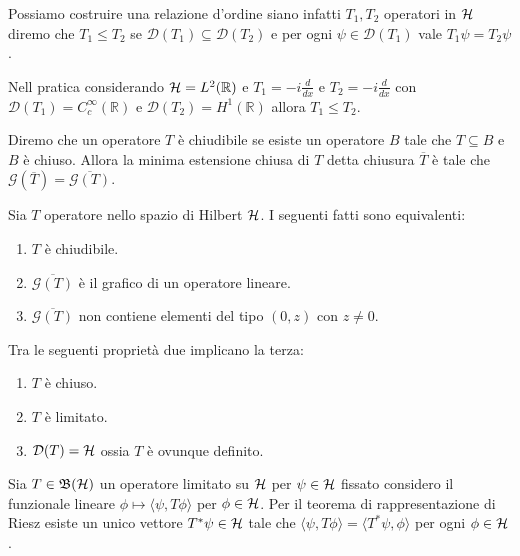 \begin{example}
    Possiamo costruire una relazione d'ordine siano infatti $T_1, T_2$ operatori in $\operatorname{\mathcal{H}}$ diremo che $T_1 \leq T_2$ se $\mathcal{D}(T_1) \subseteq \mathcal{D}(T_2)$ e per ogni $\psi \in \mathcal{D}(T_1)$ vale $T_1 \psi = T_2 \psi$.

    Nell pratica considerando $\operatorname{\mathcal{H}} = L^2(\mathbb{R})$ e $T_1 = -i \frac{d}{dx}$ e $T_2 = -i \frac{d}{dx}$ con $\mathcal{D}(T_1) = C^\infty_c(\mathbb{R})$ e $\mathcal{D}(T_2) = H^1(\mathbb{R})$ allora $T_1 \leq T_2$.
\end{example}

\begin{definition}
    Diremo che un operatore $T$ è chiudibile se esiste un operatore $B$ tale che $T \subseteq B$ e $B$ è chiuso. Allora la minima estensione chiusa di $T$ detta chiusura $\overline{T}$ è tale che $\mathcal{G}(\overline{T}) = \overline{\mathcal{G}(T)}$.
\end{definition}


\begin{proposition}
    Sia $T$ operatore nello spazio di Hilbert $\operatorname{\mathcal{H}}$. I seguenti fatti sono equivalenti:
\begin{enumerate}
    \item $T$ è chiudibile.
    \item $\overline{\mathcal{G}(T)}$ è il grafico di un operatore lineare.
    \item $\overline{\mathcal{G}(T)}$ non contiene elementi del tipo $(0,z)$ con $z \neq 0$.
\end{enumerate}
\end{proposition}


\begin{theorem}
    Tra le seguenti proprietà due implicano la terza:
\begin{enumerate}
    \item $T$ è chiuso.
    \item $T$ è limitato.
    \item $\mathcal{D}(T)=\operatorname{\mathcal{H}}$ ossia $T$ è ovunque definito.
\end{enumerate}
\end{theorem}

Sia $T \in \operatorname{\mathfrak{B}(\mathcal{H})}$ un operatore limitato su $\operatorname{\mathcal{H}}$ per $\psi \in \operatorname{\mathcal{H}}$ fissato considero il funzionale lineare $\phi \mapsto \langle \psi, T \phi \rangle$ per $\phi \in \operatorname{\mathcal{H}}$. Per il teorema di rappresentazione di Riesz esiste un unico vettore $T^* \psi \in \operatorname{\mathcal{H}}$ tale che $\langle \psi, T \phi \rangle = \langle T^* \psi, \phi \rangle$ per ogni $\phi \in \operatorname{\mathcal{H}}$.

